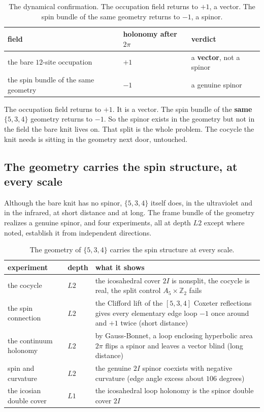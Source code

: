 \begin{table}[ht]
\centering
\begin{tabular}{@{}lll@{}}
\toprule
field & holonomy after $2\pi$ & verdict \\
\midrule
the bare $12$-site occupation & $+1$ & a \textbf{vector}, not a spinor \\
the spin bundle of the same geometry & $-1$ & a genuine spinor \\
\bottomrule
\end{tabular}
\caption{The dynamical confirmation. The occupation field returns to $+1$, a vector. The spin bundle of the same
geometry returns to $-1$, a spinor.}
\label{tab:534-holonomy}
\end{table}

The occupation field returns to $+1$. It is a vector. The spin bundle of the \textbf{same} $\{5,3,4\}$ geometry
returns to $-1$. So the spinor exists in the geometry but not in the field the bare knit lives on. That split is
the whole problem. The cocycle the knit needs is sitting in the geometry next door, untouched.

\subsection{The geometry carries the spin structure, at every scale}

Although the bare knit has no spinor, $\{5,3,4\}$ itself does, in the ultraviolet and in the infrared, at short
distance and at long. The frame bundle of the geometry realizes a genuine spinor, and four experiments, all at
depth $L2$ except where noted, establish it from independent directions.

\begin{table}[ht]
\centering
\begin{tabular}{@{}p{}p{}p{}@{}}
\toprule
experiment & depth & what it shows \\
\midrule
the cocycle & $L2$ & the icosahedral cover $2I$ is nonsplit, the cocycle is real, the split control $A_5 \times \mathbb{Z}_2$ fails \\
the spin connection & $L2$ & the Clifford lift of the $[5,3,4]$ Coxeter reflections gives every elementary edge loop $-1$ once around and $+1$ twice (short distance) \\
the continuum holonomy & $L2$ & by Gauss-Bonnet, a loop enclosing hyperbolic area $2\pi$ flips a spinor and leaves a vector blind (long distance) \\
spin and curvature & $L2$ & the genuine $2I$ spinor coexists with negative curvature (edge angle excess about $106$ degrees) \\
the icosian double cover & $L1$ & the icosahedral loop holonomy is the spinor double cover $2I$ \\
\bottomrule
\end{tabular}
\caption{The geometry of $\{5,3,4\}$ carries the spin structure at every scale.}
\label{tab:534-geometry-spin}
\end{table}

